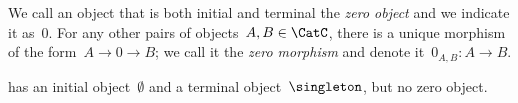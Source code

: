 \begin{comment}
  \begin{table}[b]
    \resizebox{\textwidth}{!}{
      \begin{tabular}{ccccccccccc}
        category &
        objects & morphisms &
        product (ob) & product (morph) & coproduct (ob) & coproduct (morph)
        & biproduct (morph)
        & tensor product
        &
        initial
        & terminal
        \\
        \hline

        \Set &
        sets & functions &
        Cartesian product & (not used) & disjoint union & (not used) &
        none
        & $\times$ \emph{or} $\sqcup$
        &
        $\emptyset$
        & $\{\ast\}$
        \\

        \Pos &
        posets & monotone maps &
        Cartesian product & (not used) & disjoint union & (not used)
        &
        none
        & $\times$
        &
        $\emptyset$
        & $\{\ast\}$
        \\

        \DP &
        posets & design problems &
        disjoint union & $\times_\DP$ & disjoint union & $\sqcup_\DP$
        &
        disjoint union
        & $\times$
        &
        $\emptyset$
        & $\{\ast\}$
        \\

      \end{tabular}}
    \caption{A comparison of \Pos, \Set, and \DP.}
  \end{table}
\end{comment}

\begin{ctdefinition}
  We call an object that is both initial and terminal the \emph{zero object} and we indicate it as~$0$. For any other pairs of objects~$A, B\in\CatC$, there is a unique morphism of the form~$A \to 0\to B$; we call it the \emph{zero morphism} and denote it~$0_{A,B}\colon A \to B$.
\end{ctdefinition}

\begin{example}
  \Pos has an initial object~$\emptyset$ and a terminal object~$\singleton$, but no zero object.
\end{example}

